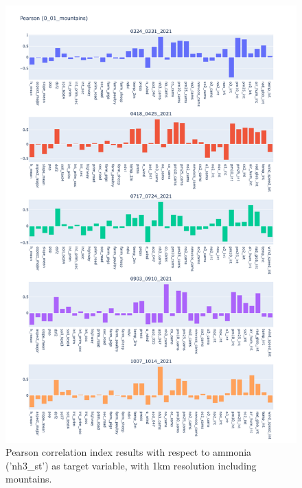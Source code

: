 \begin{figure}[H]
    \centering
    \includegraphics[scale=0.35]{images/tests/0_01_mountainsnh3_st_pearson.png}
    \caption{Pearson correlation index results with respect to ammonia ('nh3\_st') as target variable, with 1km resolution including mountains.}
    \label{fig:overview}
\end{figure}
